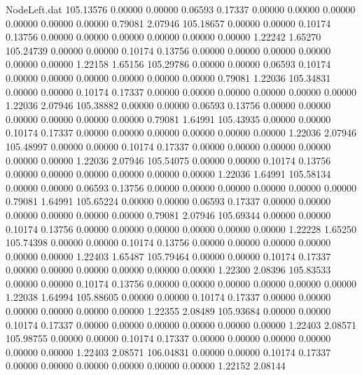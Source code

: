 \begin{filecontents}{NodeLeft.dat}
 105.13576    0.00000    0.00000     0.06593    0.17337    0.00000    0.00000    0.00000    0.00000    0.00000    0.00000    0.79081    2.07946
 105.18657    0.00000    0.00000     0.10174    0.13756    0.00000    0.00000    0.00000    0.00000    0.00000    0.00000    1.22242    1.65270
 105.24739    0.00000    0.00000     0.10174    0.13756    0.00000    0.00000    0.00000    0.00000    0.00000    0.00000    1.22158    1.65156
 105.29786    0.00000    0.00000     0.06593    0.10174    0.00000    0.00000    0.00000    0.00000    0.00000    0.00000    0.79081    1.22036
 105.34831    0.00000    0.00000     0.10174    0.17337    0.00000    0.00000    0.00000    0.00000    0.00000    0.00000    1.22036    2.07946
 105.38882    0.00000    0.00000     0.06593    0.13756    0.00000    0.00000    0.00000    0.00000    0.00000    0.00000    0.79081    1.64991
 105.43935    0.00000    0.00000     0.10174    0.17337    0.00000    0.00000    0.00000    0.00000    0.00000    0.00000    1.22036    2.07946
 105.48997    0.00000    0.00000     0.10174    0.17337    0.00000    0.00000    0.00000    0.00000    0.00000    0.00000    1.22036    2.07946
 105.54075    0.00000    0.00000     0.10174    0.13756    0.00000    0.00000    0.00000    0.00000    0.00000    0.00000    1.22036    1.64991
 105.58134    0.00000    0.00000     0.06593    0.13756    0.00000    0.00000    0.00000    0.00000    0.00000    0.00000    0.79081    1.64991
 105.65224    0.00000    0.00000     0.06593    0.17337    0.00000    0.00000    0.00000    0.00000    0.00000    0.00000    0.79081    2.07946
 105.69344    0.00000    0.00000     0.10174    0.13756    0.00000    0.00000    0.00000    0.00000    0.00000    0.00000    1.22228    1.65250
 105.74398    0.00000    0.00000     0.10174    0.13756    0.00000    0.00000    0.00000    0.00000    0.00000    0.00000    1.22403    1.65487
 105.79464    0.00000    0.00000     0.10174    0.17337    0.00000    0.00000    0.00000    0.00000    0.00000    0.00000    1.22300    2.08396
 105.83533    0.00000    0.00000     0.10174    0.13756    0.00000    0.00000    0.00000    0.00000    0.00000    0.00000    1.22038    1.64994
 105.88605    0.00000    0.00000     0.10174    0.17337    0.00000    0.00000    0.00000    0.00000    0.00000    0.00000    1.22355    2.08489
 105.93684    0.00000    0.00000     0.10174    0.17337    0.00000    0.00000    0.00000    0.00000    0.00000    0.00000    1.22403    2.08571
 105.98755    0.00000    0.00000     0.10174    0.17337    0.00000    0.00000    0.00000    0.00000    0.00000    0.00000    1.22403    2.08571
 106.04831    0.00000    0.00000     0.10174    0.17337    0.00000    0.00000    0.00000    0.00000    0.00000    0.00000    1.22152    2.08144

\end{filecontents}
